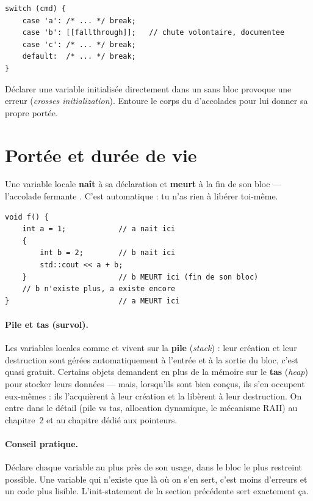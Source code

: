\documentclass[11pt]{article}
\begin{document}
\begin{lstlisting}
switch (cmd) {
    case 'a': /* ... */ break;
    case 'b': [[fallthrough]];   // chute volontaire, documentee
    case 'c': /* ... */ break;
    default:  /* ... */ break;
}
\end{lstlisting}

\begin{piege}
Déclarer une variable initialisée directement dans un  sans bloc
\code{\{ \}} provoque une erreur (\emph{crosses initialization}). Entoure le
corps du  d'accolades \code{\{ \ldots \}} pour lui donner sa propre
portée.
\end{piege}

\section{Portée et durée de vie}

Une variable locale \textbf{naît} à sa déclaration et \textbf{meurt} à la fin de
son bloc — l'accolade fermante \code{\}}. C'est automatique : tu n'as rien à
libérer toi-même.

\begin{lstlisting}
void f() {
    int a = 1;            // a nait ici
    {
        int b = 2;        // b nait ici
        std::cout << a + b;
    }                     // b MEURT ici (fin de son bloc)
    // b n'existe plus, a existe encore
}                         // a MEURT ici
\end{lstlisting}

\paragraph{Pile et tas (survol).} Les variables locales comme  et
 vivent sur la \textbf{pile} (\emph{stack}) : leur création et leur
destruction sont gérées automatiquement à l'entrée et à la sortie du bloc, c'est
quasi gratuit. Certains objets demandent en plus de la mémoire sur le
\textbf{tas} (\emph{heap}) pour stocker leurs données — mais, lorsqu'ils sont
bien conçus, ils s'en occupent eux-mêmes : ils l'acquièrent à leur création et
la libèrent à leur destruction. On entre dans le détail (pile vs tas, allocation
dynamique, le mécanisme RAII) au chapitre~2 et au chapitre dédié aux pointeurs.

\paragraph{Conseil pratique.} Déclare chaque variable au plus près de son usage,
dans le bloc le plus restreint possible. Une variable qui n'existe que là où on
s'en sert, c'est moins d'erreurs et un code plus lisible. L'init-statement de la
section précédente sert exactement ça.
\end{document}
